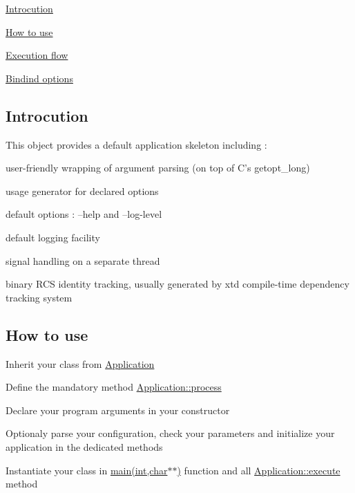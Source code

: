 \begin{DoxyItemize}
\item \hyperlink{classxtd_1_1Application_sec_intro}{Introcution}
\item \hyperlink{classxtd_1_1Application_sec_howto}{How to use}
\item \hyperlink{classxtd_1_1Application_sec_execution_flow}{Execution flow}
\item \hyperlink{classxtd_1_1Application_sec_binding_options}{Bindind options}
\end{DoxyItemize}\hypertarget{classxtd_1_1Application_sec_intro}{}\subsection{Introcution}\label{classxtd_1_1Application_sec_intro}
This object provides a default application skeleton including \-:
\begin{DoxyItemize}
\item user-\/friendly wrapping of argument parsing (on top of C's getopt\-\_\-long)
\item usage generator for declared options
\item default options \-: --help and --log-\/level
\item default logging facility
\item signal handling on a separate thread
\item binary R\-C\-S identity tracking, usually generated by xtd compile-\/time dependency tracking system
\end{DoxyItemize}\hypertarget{classxtd_1_1Application_sec_howto}{}\subsection{How to use}\label{classxtd_1_1Application_sec_howto}

\begin{DoxyEnumerate}
\item Inherit your class from \hyperlink{classxtd_1_1Application}{Application}
\item Define the mandatory method \hyperlink{classxtd_1_1Application_aef6043d47982bc1983a84e2c8a53f0cd}{Application\-::process}
\item Declare your program arguments in your constructor
\item Optionaly parse your configuration, check your parameters and initialize your application in the dedicated methods
\item Instantiate your class in \hyperlink{doc_2example_2Application_8hh_a6b77b2233054447db17959182b5fb02b}{main(int,char$\ast$$\ast$)} function and all \hyperlink{classxtd_1_1Application_ae9241351a9caefa4b96bc906d3db144c}{Application\-::execute} method
\end{DoxyEnumerate}

